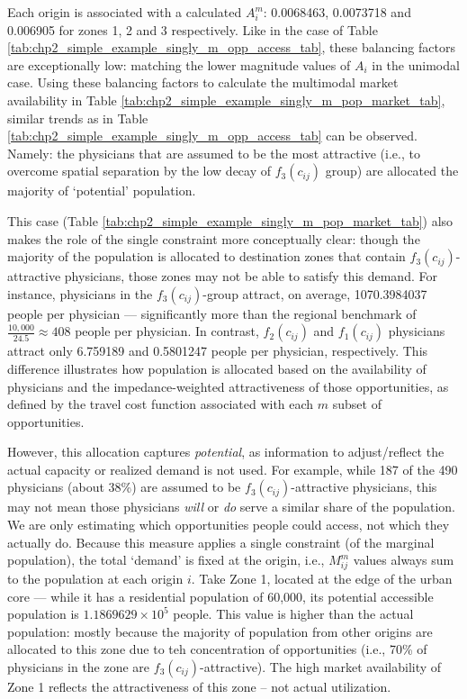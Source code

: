 \documentclass[
11pt, %
oneside, %
english, %
singlespacing, %
]{macthesis} %
\begin{document}
Each origin is associated with a calculated \(A_i^m\): 0.0068463, 0.0073718 and 0.006905 for zones 1, 2 and 3 respectively. Like in the case of Table \ref{tab:chp2_simple_example_singly_m_opp_access_tab}, these balancing factors are exceptionally low: matching the lower magnitude values of \(A_i\) in the unimodal case. Using these balancing factors to calculate the multimodal market availability in Table \ref{tab:chp2_simple_example_singly_m_pop_market_tab}, similar trends as in Table \ref{tab:chp2_simple_example_singly_m_opp_access_tab} can be observed. Namely: the physicians that are assumed to be the most attractive (i.e., to overcome spatial separation by the low decay of \(f_3(c_{ij})\) group) are allocated the majority of `potential' population.



This case (Table \ref{tab:chp2_simple_example_singly_m_pop_market_tab}) also makes the role of the single constraint more conceptually clear: though the majority of the population is allocated to destination zones that contain \(f_3(c_{ij})\)-attractive physicians, those zones may not be able to satisfy this demand. For instance, physicians in the \(f_3(c_{ij})\)-group attract, on average, 1070.3984037 people per physician --- significantly more than the regional benchmark of \(\frac{10,000}{24.5} \approx 408\) people per physician. In contrast, \(f_2(c_{ij})\) and \(f_1(c_{ij})\) physicians attract only 6.759189 and 0.5801247 people per physician, respectively. This difference illustrates how population is allocated based on the availability of physicians and the impedance-weighted attractiveness of those opportunities, as defined by the travel cost function associated with each \(m\) subset of opportunities.

However, this allocation captures \emph{potential}, as information to adjust/reflect the actual capacity or realized demand is not used. For example, while 187 of the 490 physicians (about 38\%) are assumed to be \(f_3(c_{ij})\)-attractive physicians, this may not mean those physicians \emph{will} or \emph{do} serve a similar share of the population. We are only estimating which opportunities people could access, not which they actually do. Because this measure applies a single constraint (of the marginal population), the total `demand' is fixed at the origin, i.e., \(M_{ij}^m\) values always sum to the population at each origin \(i\). Take Zone 1, located at the edge of the urban core --- while it has a residential population of 60,000, its potential accessible population is \ensuremath{1.1869629\times 10^{5}} people. This value is higher than the actual population: mostly because the majority of population from other origins are allocated to this zone due to teh concentration of opportunities (i.e., 70\% of physicians in the zone are \(f_3(c_{ij})\)-attractive). The high market availability of Zone 1 reflects the attractiveness of this zone -- not actual utilization.
\end{document}
